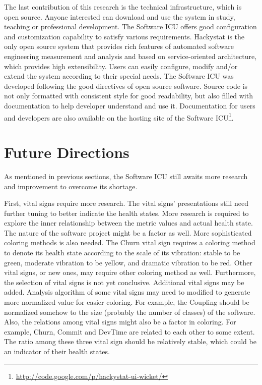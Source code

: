The last contribution of this research is the technical infrastructure, which is open source. Anyone interested can download and use the system in study, teaching or professional development. The Software ICU offers good configuration and customization capability to satisfy various requirements. Hackystat is the only open source system that provides rich features of automated software engineering measurement and analysis and based on service-oriented architecture, which provides high extensibility. Users can easily configure, modify and/or extend the system according to their special needs. The Software ICU was developed following the good directives of open source software. Source code is not only formatted with consistent style for good readability, but also filled with documentation to help developer understand and use it. Documentation for users and developers are also available on the hosting site of the Software ICU\footnote{\url{http://code.google.com/p/hackystat-ui-wicket/}}.


\section{Future Directions}
As mentioned in previous sections, the Software ICU still awaits more research and improvement to overcome its shortage.

First, vital signs require more research. The vital signs' presentations still need further tuning to better indicate the health states. More research is required to explore the inner relationship between the metric values and actual health state. The nature of the software project might be a factor as well. More sophisticated coloring methods is also needed. The Churn vital sign requires a coloring method to denote its health state according to the scale of its vibration: stable to be green, moderate vibration to be yellow, and dramatic vibration to be red. Other vital signs, or new ones, may require other coloring method as well. Furthermore, the selection of vital signs is not yet conclusive. Additional vital signs may be added. Analysis algorithm of some vital signs may need to modified to generate more normalized value for easier coloring. For example, the Coupling should be normalized somehow to the size (probably the number of classes) of the software. Also, the relations among vital signs might also be a factor in coloring. For example, Churn, Commit and DevTime are related to each other to some extent. The ratio among these three vital sign should be relatively stable, which could be an indicator of their health states.


